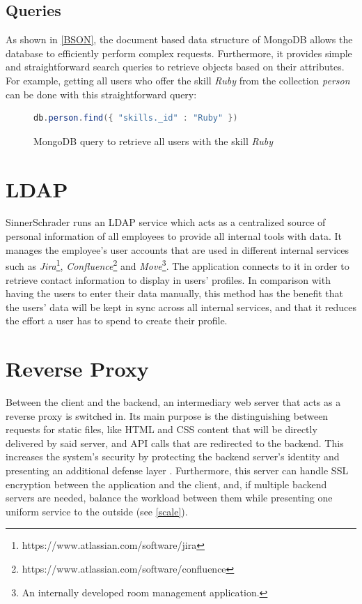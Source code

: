 \newpage

\subsection{Queries}
As shown in \ref{BSON}, the document based data structure of MongoDB allows the database to efficiently perform complex requests. Furthermore, it provides simple and straightforward search queries to retrieve objects based on their attributes. For example, getting all users who offer the skill \textit{Ruby} from the collection \textit{person} can be done with this straightforward query:
\begin{figure}[h]
\begin{lstlisting}[language=Java]
db.person.find({ "skills._id" : "Ruby" })
\end{lstlisting}
\caption[Code: Example Database Query]{MongoDB query to retrieve all users with the skill \textit{Ruby}}
\end{figure}

\section{LDAP}
SinnerSchrader runs an LDAP service which acts as a centralized source of personal information of all employees to provide all internal tools with data.
It manages the employee's user accounts that are used in different internal services such as \textit{Jira}\footnote{https://www.atlassian.com/software/jira}, \textit{Confluence}\footnote{https://www.atlassian.com/software/confluence} and \textit{Move}\footnote{An internally developed room management application.}.
The application connects to it in order to retrieve contact information to display in users' profiles. In comparison with having the users to enter their data manually, this method has the benefit that the users' data will be kept in sync across all internal services, and that it reduces the effort a user has to spend to create their profile.

\section{Reverse Proxy}
Between the client and the backend, an intermediary web server that acts as a reverse proxy is switched in. Its main purpose is the distinguishing between requests for static files, like HTML and CSS content that will be directly delivered by said server, and API calls that are redirected to the backend. This increases the system's security by protecting the backend server's identity and presenting an additional defense layer \cite{NGINX}. Furthermore, this server can handle SSL encryption between the application and the client, and, if multiple backend servers are needed, balance the workload between them while presenting one uniform service to the outside (see \ref{scale}).

